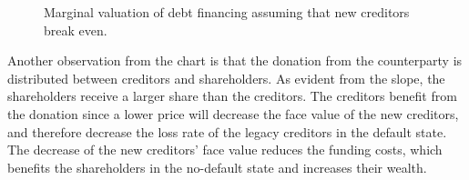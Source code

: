 \documentclass[main.tex]{subfiles}
\begin{document}
        \begin{figure}
            \centering
            \resizebox{\textwidth}{!}{%
                
            }
            \caption{
                Marginal valuation of debt financing 
                assuming that new creditors break even.
            }
            \label{fig:marginal-value-debt-financing}
        \end{figure}

        Another observation from the chart is that the donation from the counterparty 
        is distributed between creditors and shareholders.
        As evident from the slope, the shareholders receive a larger share than the creditors.
        The creditors benefit from the donation since a lower price will
        decrease the face value of the new creditors, and therefore decrease the loss rate
        of the legacy creditors in the default state.
        The decrease of the new creditors' face value reduces the funding costs,
        which benefits the shareholders in the no-default state and increases their wealth.  
\end{document}

